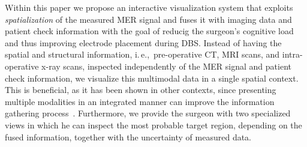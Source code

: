 \documentclass{vgtc}                          %
\begin{document}
Within this paper we propose an interactive visualization system that exploits {\it spatialization} of the measured MER signal and fuses it with imaging data and patient check information with the goal of reducig the surgeon's cognitive load and thus improving electrode placement during DBS. Instead of having the spatial and structural information, i.\,e.,~pre-operative CT, MRI scans, and intra-operative x-ray scans, inspected independently of the MER signal and patient check information, we visualize this multimodal data in a single spatial context. This is beneficial, as it has been shown in other contexts, since presenting multiple modalities in an integrated manner can improve the information gathering process~\cite{10.1109/BIOMEDVIS.1995.10008}. Furthermore, we provide the surgeon with two specialized views in which he can inspect the most probable target region, depending on the fused information, together with the uncertainty of measured data.
%
%
%
%
%
\end{document}
